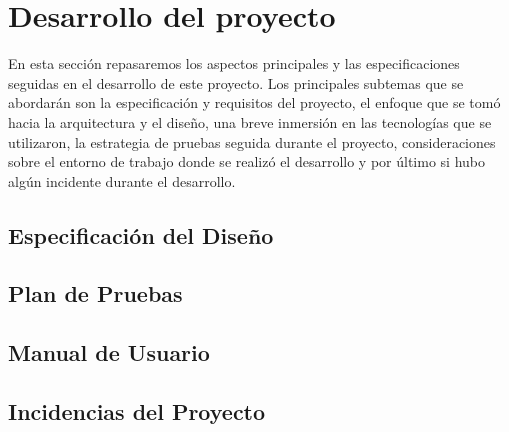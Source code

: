 \section{Desarrollo del proyecto}
En esta sección repasaremos los aspectos principales y las especificaciones seguidas 
en el desarrollo de este proyecto. Los principales subtemas que se abordarán son la 
especificación y requisitos del proyecto, el enfoque que se tomó hacia la arquitectura 
y el diseño, una breve inmersión en las tecnologías que se utilizaron, la estrategia de 
pruebas seguida durante el proyecto, consideraciones sobre el entorno de trabajo donde 
se realizó el desarrollo y por último si hubo algún incidente durante el desarrollo.


\subsection{Especificación del Diseño}


\subsection{Plan de Pruebas}
\subsection{Manual de Usuario}
\subsection{Incidencias del Proyecto}
\pagebreak